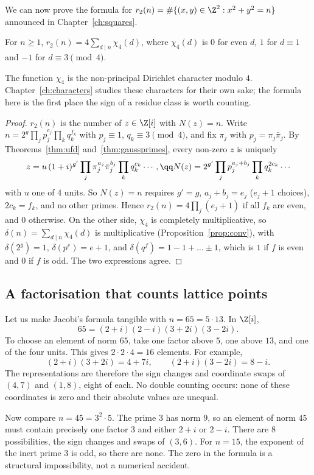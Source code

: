 We can now prove the formula for $r_2(n)=\#\{(x,y)\in\Z^2:x^2+y^2=n\}$ announced in Chapter~\ref{ch:squares}.

\begin{theorem}[Jacobi]\label{thm:r2}
For $n\ge1$, $r_2(n)=4\displaystyle\sum_{d\mid n}\chi_4(d)$, where $\chi_4(d)$ is $0$ for even $d$, $1$ for $d\equiv1$ and $-1$ for $d\equiv3\pmod4$.
\end{theorem}
The function $\chi_4$ is the non-principal Dirichlet character modulo $4$. Chapter~\ref{ch:characters} studies these characters for their own sake; the formula here is the first place the sign of a residue class is worth counting.
\begin{proof}
$r_2(n)$ is the number of $z\in\Z[i]$ with $N(z)=n$. Write $n=2^g\prod_jp_j^{e_j}\prod_kq_k^{f_k}$ with $p_j\equiv1$, $q_k\equiv3\pmod4$, and fix $\pi_j$ with $p_j=\pi_j\bar\pi_j$. By Theorems~\ref{thm:ufd} and~\ref{thm:gaussprimes}, every non-zero $z$ is uniquely
\[
\begin{gathered}z=u\,(1+i)^{g'}\prod_j\pi_j^{a_j}\bar\pi_j^{b_j}\prod_kq_k^{c_k}\cdots,\qq N(z)=2^{g'}\prod_jp_j^{a_j+b_j}\prod_kq_k^{2c_k}\cdots\end{gathered}
\]
with $u$ one of $4$ units. So $N(z)=n$ requires $g'=g$, $a_j+b_j=e_j$ ($e_j+1$ choices), $2c_k=f_k$, and no other primes. Hence $r_2(n)=4\prod_j(e_j+1)$ if all $f_k$ are even, and $0$ otherwise.
On the other side, $\chi_4$ is completely multiplicative, so $\delta(n)=\sum_{d\mid n}\chi_4(d)$ is multiplicative (Proposition~\ref{prop:conv}), with $\delta(2^g)=1$, $\delta(p^e)=e+1$, and $\delta(q^f)=1-1+\dots\pm1$, which is $1$ if $f$ is even and $0$ if $f$ is odd. The two expressions agree.
\end{proof}

\subsection*{A factorisation that counts lattice points}
Let us make Jacobi's formula tangible with $n=65=5\cdot13$. In $\Z[i]$,
\[
65=(2+i)(2-i)(3+2i)(3-2i).
\]
To choose an element of norm $65$, take one factor above $5$, one above $13$,
and one of the four units. This gives $2\cdot2\cdot4=16$ elements. For example,
\[
(2+i)(3+2i)=4+7i,\qquad
(2+i)(3-2i)=8-i.
\]
The representations are therefore the sign changes and coordinate swaps of
$(4,7)$ and $(1,8)$, eight of each. No double counting occurs: none of these
coordinates is zero and their absolute values are unequal.

Now compare $n=45=3^2\cdot5$. The prime $3$ has norm $9$, so an element of norm
$45$ must contain precisely one factor $3$ and either $2+i$ or $2-i$.
There are $8$ possibilities, the sign changes and swaps of $(3,6)$.
For $n=15$, the exponent of the inert prime $3$ is odd, so there are none.
The zero in the formula is a structural impossibility, not a numerical accident.

